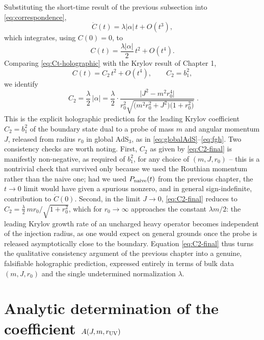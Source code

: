 \documentclass[11pt]{article}
\begin{document}
Substituting the short-time result of the previous subsection into \eqref{eq:correspondence},
\begin{equation}
\dot C(t) = \lambda|\alpha|\,t + O(t^3) ,
\end{equation}
which integrates, using $C(0)=0$, to
\begin{equation}
C(t) = \frac{\lambda|\alpha|}{2}\,t^2 + O(t^4) .
\label{eq:Ct-holographic}
\end{equation}
Comparing \eqref{eq:Ct-holographic} with the Krylov result of Chapter 1,
\begin{equation}
C(t) = C_2\,t^2+O(t^4), \qquad C_2=b_1^2 ,
\end{equation}
we identify
\begin{equation}
\boxed{\;
C_2 = \frac{\lambda}{2}\,|\alpha|
= \frac{\lambda}{2}\cdot\frac{\big|J^2-m^2r_0^4\big|}{r_0^2\sqrt{\big(m^2r_0^2+J^2\big)\big(1+r_0^2\big)}}
\;} .
\label{eq:C2-final}
\end{equation}
This is the explicit holographic prediction for the leading Krylov coefficient $C_2=b_1^2$ of the boundary state dual to a probe of mass $m$ and angular momentum $J$, released from radius $r_0$ in global AdS$_3$, as in \eqref{eq:globalAdS}--\eqref{eq:fgh}. Two consistency checks are worth noting. First, $C_2$ as given by \eqref{eq:C2-final} is manifestly non-negative, as required of $b_1^2$, for any choice of $(m,J,r_0)$ -- this is a nontrivial check that survived only because we used the Routhian momentum rather than the naive one; had we used $P_{\rm naive}(t)$ from the previous chapter, the $t\to0$ limit would have given a spurious nonzero, and in general sign-indefinite, contribution to $\dot C(0)$. Second, in the limit $J\to0$, \eqref{eq:C2-final} reduces to $C_2=\tfrac{\lambda}{2}\,mr_0/\sqrt{1+r_0^2}$, which for $r_0\to\infty$ approaches the constant $\lambda m/2$: the leading Krylov growth rate of an uncharged heavy operator becomes independent of the injection radius, as one would expect on general grounds once the probe is released asymptotically close to the boundary. Equation \eqref{eq:C2-final} thus turns the qualitative consistency argument of the previous chapter into a genuine, falsifiable holographic prediction, expressed entirely in terms of bulk data $(m,J,r_0)$ and the single undetermined normalization $\lambda$.

\section{Analytic determination of the coefficient $A(J,m,r_{\rm UV})$}
\end{document}
